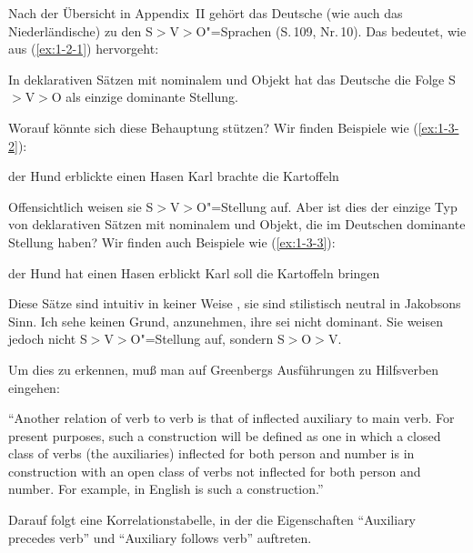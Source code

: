 \documentclass[output=paper]{langsci/langscibook}
\begin{document}
\label{subsec:1-3.1}

\ssubsubsection{}%
\label{subsubsec:1-3.1.1}

Nach der Übersicht in Appendix~II gehört das Deutsche (wie auch das Niederländische) zu den S$>$V$>$O"=Sprachen (S.\,109, Nr.\,10). Das bedeutet, wie aus (\ref{ex:1-2-1}) hervorgeht:
\begin{exe}
\ex\label{ex:1-3-1}
In deklarativen Sätzen mit nominalem  und Objekt hat das Deutsche
die Folge S$>$V$>$O als einzige dominante Stellung.
\end{exe}
Worauf könnte sich diese Behauptung stützen? Wir finden Beispiele wie (\ref{ex:1-3-2}):
\begin{exe}
\ex\label{ex:1-3-2}
\begin{xlist}
\ex\label{ex:1-3-2a} der Hund erblickte einen Hasen
\ex\label{ex:1-3-2b} Karl brachte die Kartoffeln
\end{xlist}
\end{exe}
Offensichtlich weisen sie S$>$V$>$O"=Stellung auf. Aber ist dies der einzige Typ von deklarativen Sätzen mit nominalem  und Objekt, die im Deutschen dominante
Stellung haben? Wir finden auch Beispiele wie (\ref{ex:1-3-3}):
\begin{exe}
\ex\label{ex:1-3-3}
\begin{xlist}
\ex\label{ex:1-3-3a} der Hund hat einen Hasen erblickt
\ex\label{ex:1-3-3b} Karl soll die Kartoffeln bringen
\end{xlist}
\end{exe}
Diese Sätze sind intuitiv in keiner Weise , sie sind stilistisch neutral in Jakobsons Sinn. Ich sehe keinen Grund, anzunehmen, ihre  sei nicht dominant. Sie weisen jedoch nicht S$>$V$>$O"=Stellung auf, sondern S$>$O$>$V.

Um dies zu erkennen, muß man auf Greenbergs Ausführungen zu Hilfsverben
eingehen:
\begin{exe}
\ex\label{ex:1-3-4}
"`Another relation of verb to verb is that of inflected auxiliary to
main verb. For present purposes, such a construction will be defined
as one in which a closed class of verbs (the auxiliaries) inflected
for both person and number is in construction with an open class of
verbs not inflected for both person and number. For example, in
English  is such a construction."' \citep[84]{Greenberg1963}
\end{exe}
Darauf folgt eine Korrelationstabelle, in der die Eigenschaften "`Auxiliary precedes
verb"' und "`Auxiliary follows verb"' auftreten.
\end{document}
